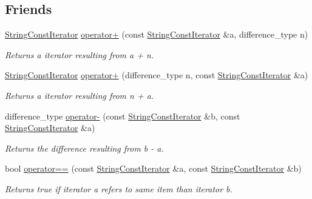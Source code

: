 \subsection*{Friends}
\begin{DoxyCompactItemize}
\item 
\hyperlink{struct_mdt_1_1_plain_text_1_1_string_const_iterator}{String\+Const\+Iterator} \hyperlink{struct_mdt_1_1_plain_text_1_1_string_const_iterator_aa6f9bb8b739cc2e480b3832e51f2311b}{operator+} (const \hyperlink{struct_mdt_1_1_plain_text_1_1_string_const_iterator}{String\+Const\+Iterator} \&a, difference\+\_\+type n)
\begin{DoxyCompactList}\small\item\em Returns a iterator resulting from {\itshape a} + {\itshape n}. \end{DoxyCompactList}\item 
\hyperlink{struct_mdt_1_1_plain_text_1_1_string_const_iterator}{String\+Const\+Iterator} \hyperlink{struct_mdt_1_1_plain_text_1_1_string_const_iterator_abeed2837c5315658a676d9761bfd5f56}{operator+} (difference\+\_\+type n, const \hyperlink{struct_mdt_1_1_plain_text_1_1_string_const_iterator}{String\+Const\+Iterator} \&a)
\begin{DoxyCompactList}\small\item\em Returns a iterator resulting from {\itshape n} + {\itshape a}. \end{DoxyCompactList}\item 
difference\+\_\+type \hyperlink{struct_mdt_1_1_plain_text_1_1_string_const_iterator_a2b48d08e991c1a53e135d72a92ba9519}{operator-\/} (const \hyperlink{struct_mdt_1_1_plain_text_1_1_string_const_iterator}{String\+Const\+Iterator} \&b, const \hyperlink{struct_mdt_1_1_plain_text_1_1_string_const_iterator}{String\+Const\+Iterator} \&a)
\begin{DoxyCompactList}\small\item\em Returns the difference resulting from {\itshape b} -\/ {\itshape a}. \end{DoxyCompactList}\item 
bool \hyperlink{struct_mdt_1_1_plain_text_1_1_string_const_iterator_a8d4013367bdb5651af369fb6dbd20361}{operator==} (const \hyperlink{struct_mdt_1_1_plain_text_1_1_string_const_iterator}{String\+Const\+Iterator} \&a, const \hyperlink{struct_mdt_1_1_plain_text_1_1_string_const_iterator}{String\+Const\+Iterator} \&b)
\begin{DoxyCompactList}\small\item\em Returns true if iterator a refers to same item than iterator b. \end{DoxyCompactList}\item 

\end{DoxyCompactItemize}
